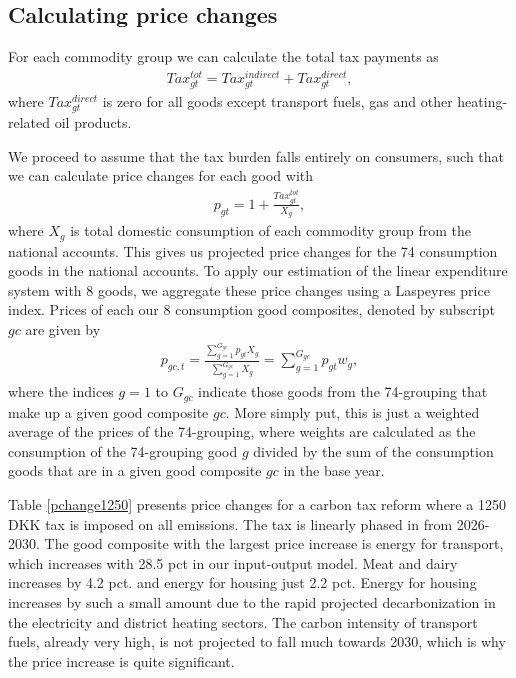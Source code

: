 \subsection{Calculating price changes}
For each commodity group we can calculate the total tax payments as
\begin{align}
    Tax^{tot}_{gt} = Tax^{indirect}_{gt} + Tax_{gt}^{direct},
\end{align}
where $Tax_{gt}^{direct}$ is zero for all goods except transport fuels, gas and other heating-related oil products.

We proceed to assume that the tax burden falls entirely on consumers, such that we can calculate price changes for each good with
\begin{align}
    p_{gt} = 1 + \frac{Tax^{tot}_{gt}}{X_g},
\end{align}
where $X_g$ is total domestic consumption of each commodity group from the national accounts. This gives us projected price changes for the 74 consumption goods in the national accounts. To apply our estimation of the linear expenditure system with 8 goods, we aggregate these price changes using a Laspeyres price index. Prices of each our 8 consumption good composites, denoted by subscript $gc$ are given by
\begin{align}\label{eq:pricechanges}
    p_{gc,t} = \frac{\sum_{g=1}^{G_{gc}} p_{gt} X_{g}}{\sum_{g=1}^{G_{gc}} X_g } = \sum_{g=1}^{G_{gc}} p_{gt} w_g , 
\end{align}
where the indices $g=1$ to $G_{gc}$ indicate those goods from the 74-grouping that make up a given good composite $gc$. More simply put, this is just a weighted average of the prices of the 74-grouping, where weights are calculated as the consumption of the 74-grouping good $g$ divided by the sum of the consumption goods that are in a given good composite $gc$ in the base year.

Table \ref{pchange1250} presents price changes for a carbon tax reform where a 1250 DKK tax is imposed on all emissions. The tax is linearly phased in from 2026-2030. The good composite with the largest price increase is energy for transport, which increases with 28.5 pct in our input-output model. Meat and dairy increases by 4.2 pct. and energy for housing just 2.2 pct. Energy for housing increases by such a small amount due to the rapid projected decarbonization in the electricity and district heating sectors. The carbon intensity of transport fuels, already very high, is not projected to fall much towards 2030, which is why the price increase is quite significant. 

